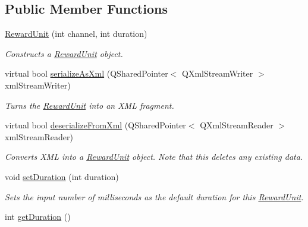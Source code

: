 \subsection*{Public Member Functions}
\begin{DoxyCompactItemize}
\item 
\hyperlink{class_picto_1_1_reward_unit_adda8f66329df0bb15591a7d24a430c2f}{Reward\-Unit} (int channel, int duration)
\begin{DoxyCompactList}\small\item\em Constructs a \hyperlink{class_picto_1_1_reward_unit}{Reward\-Unit} object. \end{DoxyCompactList}\item 
\hypertarget{class_picto_1_1_reward_unit_a543b40dc556a7b41d0a38951a8659efb}{virtual bool \hyperlink{class_picto_1_1_reward_unit_a543b40dc556a7b41d0a38951a8659efb}{serialize\-As\-Xml} (Q\-Shared\-Pointer$<$ Q\-Xml\-Stream\-Writer $>$ xml\-Stream\-Writer)}\label{class_picto_1_1_reward_unit_a543b40dc556a7b41d0a38951a8659efb}

\begin{DoxyCompactList}\small\item\em Turns the \hyperlink{class_picto_1_1_reward_unit}{Reward\-Unit} into an X\-M\-L fragment. \end{DoxyCompactList}\item 
\hypertarget{class_picto_1_1_reward_unit_a8fec043d14d53c6feb5032624bb15bd3}{virtual bool \hyperlink{class_picto_1_1_reward_unit_a8fec043d14d53c6feb5032624bb15bd3}{deserialize\-From\-Xml} (Q\-Shared\-Pointer$<$ Q\-Xml\-Stream\-Reader $>$ xml\-Stream\-Reader)}\label{class_picto_1_1_reward_unit_a8fec043d14d53c6feb5032624bb15bd3}

\begin{DoxyCompactList}\small\item\em Converts X\-M\-L into a \hyperlink{class_picto_1_1_reward_unit}{Reward\-Unit} object. Note that this deletes any existing data. \end{DoxyCompactList}\item 
\hypertarget{class_picto_1_1_reward_unit_a9db98bab0226e5c9c1fe59f3f16003ed}{void \hyperlink{class_picto_1_1_reward_unit_a9db98bab0226e5c9c1fe59f3f16003ed}{set\-Duration} (int duration)}\label{class_picto_1_1_reward_unit_a9db98bab0226e5c9c1fe59f3f16003ed}

\begin{DoxyCompactList}\small\item\em Sets the input number of milliseconds as the default duration for this \hyperlink{class_picto_1_1_reward_unit}{Reward\-Unit}. \end{DoxyCompactList}\item 
\hypertarget{class_picto_1_1_reward_unit_a2e351bfb4afe4cac9ed66f3b4c424c2d}{int \hyperlink{class_picto_1_1_reward_unit_a2e351bfb4afe4cac9ed66f3b4c424c2d}{get\-Duration} ()}\label{class_picto_1_1_reward_unit_a2e351bfb4afe4cac9ed66f3b4c424c2d}


\end{DoxyCompactItemize}
